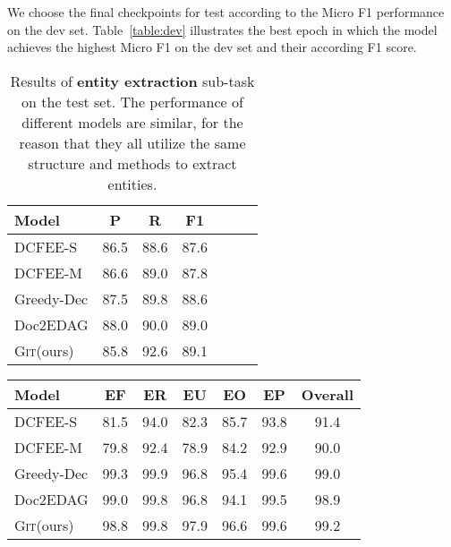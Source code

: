 \documentclass[11pt,a4paper]{article}
\newcommand{\modelname}{\textsc{Git}\xspace}
\begin{document}
We choose the final checkpoints for test according to the Micro F1 performance on the dev set. 
Table~\ref{table:dev} illustrates the best epoch in which the model achieves the highest Micro F1 on the dev set and their according F1 score.

\begin{table}[htbp]
\centering
\begin{tabular}{lcccccc}
\hline
\bf Model & \bf P & \bf R & \bf F1 \\
\hline
DCFEE-S  & 86.5 & 88.6 & 87.6 \\
DCFEE-M  & 86.6 & 89.0 & 87.8 \\
Greedy-Dec & 87.5 & 89.8 & 88.6 \\
Doc2EDAG  &  88.0 & 90.0 & 89.0\\
\hline
\modelname (ours) & 85.8 & 92.6 & 89.1 \\
\hline
\end{tabular}
\caption{Results of \textbf{entity extraction} sub-task on the test set. The performance of different models are similar, for the reason that they all utilize the same structure and methods to extract entities.
}
\label{table:ner}
\end{table}

\begin{table*}[htbp]
\centering
\begin{tabular}{lcccccc}
\hline
\bf Model & \bf EF & \bf ER & \bf EU & \bf EO & \bf EP & \bf Overall \\
\hline
DCFEE-S  & 81.5 & 94.0 & 82.3 & 85.7 & 93.8 & 91.4 \\
DCFEE-M  & 79.8 & 92.4 & 78.9 & 84.2 & 92.9 & 90.0 \\
Greedy-Dec  & 99.3 & 99.9 & 96.8 & 95.4 & 99.6 & 99.0 \\
Doc2EDAG  & 99.0 & 99.8 & 96.8 & 94.1 & 99.5 & 98.9 \\
\hline
\modelname (ours) & 98.8 & 99.8 & 97.9 & 96.6 & 99.6 & 99.2 \\
\hline
\end{tabular}
\caption{F1 scores results of \textbf{event types detection} sub-task on the test set. All the models obtains more than 90.0 micro F1 score. \modelname slightly outperform Doc2EDAG.
}
\label{table:triggering}
\end{table*}
\end{document}
